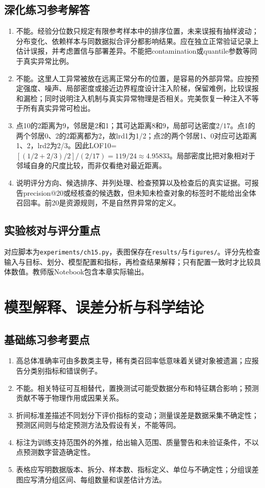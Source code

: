 \section*{深化练习参考解答}
\begin{enumerate}[label=D\arabic*.]
\item 不能。经验分位数只规定有限参考样本中的排序位置，未来误报有抽样波动；分布变化、依赖样本与同数据拟合评分都影响结果。应在独立正常验证记录上估计误报，并考虑置信与部署差异。不能把contamination或quantile参数等同于真实异常比例。
\item 不能。这里人工异常被放在远离正常分布的位置，是容易的外部异常。应按预定强度、噪声、局部密度或接近边界程度设计注入阶梯，保留难例，比较误报和漏检；同时说明注入机制与真实异常物理是否相关。完美恢复一种注入不等于所有真实异常可检出。
\item 点10的2距离为9，邻居是2和1；其可达距离8和9，局部可达密度$2/17$。点1的两个邻居0、2的2距离都为2，故lrd1为1/2；点2的两个邻居1、0对应可达距离1、2，lrd2为2/3。因此LOF10=$[(1/2+2/3)/2]/(2/17)=119/24\approx4.95833$。局部密度比把对象相对于邻域自身的尺度比较，而非仅看绝对最近距离。
\item 说明评分方向、候选排序、并列处理、检查预算以及检查后的真实证据。可报告precision@20或经核查的候选数，但未知未检查对象的标签时不能给出全体召回率。前20是资源规则，不是自然界异常的定义。
\end{enumerate}

\section*{实验核对与评分重点}
对应脚本为\texttt{experiments/ch15.py}，表图保存在\texttt{results/}与\texttt{figures/}。评分先检查输入与目标、划分、模型配置和指标，再检查结果解释；只有配置一致时才比较具体数值。教师版Notebook包含本章实际输出。

\chapter{模型解释、误差分析与科学结论}
\section*{基础练习参考要点}
\begin{enumerate}[label=\arabic*.]
\item 高总体准确率可由多数类主导，稀有类召回率低意味着关键对象被遗漏；应报告分类别指标和错误例子。
\item 不能。相关特征可互相替代，置换测试可能受数据分布和特征耦合影响；预测贡献不等于物理作用或因果关系。
\item 折间标准差描述不同划分下评价指标的变动；测量误差是数据采集不确定性；预测区间则与给定预测方法及假设有关，不能等同。
\item 标注为训练支持范围外的外推，给出输入范围、质量警告和未验证条件，不以点预测数字营造确定性。
\item 表格应写明数据版本、拆分、样本数、指标定义、单位与不确定性；分组误差图应写清分组区间、每组数量和误差估计方法。
\end{enumerate}
